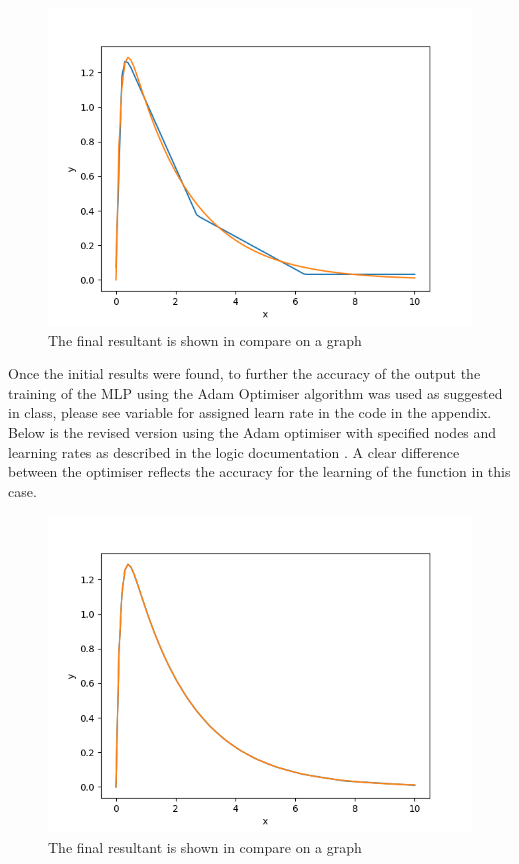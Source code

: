 \documentclass[a4paper, 10pt]{IEEEconf}
\begin{document}
\begin{figure}[H]
  \includegraphics[width=0.8\linewidth, center]{images/plot}
  \caption{The final resultant is shown in compare on a graph}
  \label{fig:The final resultant is shown in compare on a graph}
\end{figure}

Once the initial results were found, to further the accuracy of the output the training of the MLP using the Adam Optimiser algorithm was used as suggested in class, please see variable for assigned learn rate in the code in the appendix. Below is the revised version using the Adam optimiser with specified nodes and learning rates as described in the logic documentation \cite{adam}. A clear difference between the optimiser reflects the accuracy for the learning of the function in this case.

\begin{figure}[H]
  \includegraphics[width=0.8\linewidth, center]{images/3}
  \caption{The final resultant is shown in compare on a graph}
  \label{fig:The final resultant is shown in compare on a graph}
\end{figure}
\end{document}
